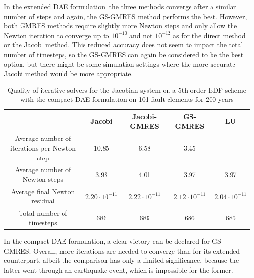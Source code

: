 In the extended DAE formulation, the three methods converge after a similar number of steps and again, the GS-GMRES method performs the best. However, both GMRES methods require slightly more Newton steps and only allow the Newton iteration to converge up to $10^{-10}$ and not $10^{-12}$ as for the direct method or the Jacobi method. This reduced accuracy does not seem to impact the total number of timesteps, so the GS-GMRES can again be considered to be the best option, but there might be some simulation settings where the more accurate Jacobi method would be more appropriate.

\begin{table}[H]
	\begin{tabular}{ | c || c c c | c |}
		\hline
		& Jacobi & Jacobi-GMRES & GS-GMRES & LU \\ \hline\hline
		Average number of iterations per Newton step &  10.85  &    6.58   &    3.45  & -  \\
		Average number of Newton steps & 3.98  &     4.01    &   3.97  &     3.97 \\
		Average final Newton residual &   $2.20\cdot10^{-11}$  & $2.22\cdot10^{-11}$  & $2.12\cdot10^{-11}$  & $2.04\cdot10^{-11}$ \\
		Total number of timesteps & 686  &      686    &    686    &    686 \\
		 \hline
	\end{tabular}
	\caption{Quality of iterative solvers for the Jacobian system on a 5th-order BDF scheme with the compact DAE formulation on 101 fault elements for 200 years}
	\label{tab:compactDAE_iterativeSolversJacobian}
\end{table}
In the compact DAE formulation, a clear victory can be declared for GS-GMRES. Overall, more iterations are needed to converge than for its extended counterpart, albeit the comparison has only a limited significance, because the latter went through an earthquake event, which is impossible for the former. 

